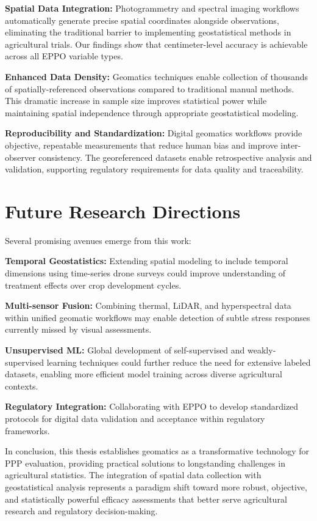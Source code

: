 \documentclass[12pt,a4paper,oneside]{report}
\begin{document}
\textbf{Spatial Data Integration:} Photogrammetry and spectral imaging workflows automatically generate precise spatial coordinates alongside observations, eliminating the traditional barrier to implementing geostatistical methods in agricultural trials. Our findings show that centimeter-level accuracy is achievable across all EPPO variable types.

\textbf{Enhanced Data Density:} Geomatics techniques enable collection of thousands of spatially-referenced observations compared to traditional manual methods. This dramatic increase in sample size improves statistical power while maintaining spatial independence through appropriate geostatistical modeling.

\textbf{Reproducibility and Standardization:} Digital geomatics workflows provide objective, repeatable measurements that reduce human bias and improve inter-observer consistency. The georeferenced datasets enable retrospective analysis and validation, supporting regulatory requirements for data quality and traceability.

\section{Future Research Directions}

Several promising avenues emerge from this work:

\textbf{Temporal Geostatistics:} Extending spatial modeling to include temporal dimensions using time-series drone surveys could improve understanding of treatment effects over crop development cycles.

\textbf{Multi-sensor Fusion:} Combining thermal, LiDAR, and hyperspectral data within unified geomatic workflows may enable detection of subtle stress responses currently missed by visual assessments.

\textbf{Unsupervised ML:} Global development of self-supervised and weakly-supervised learning techniques could further reduce the need for extensive labeled datasets, enabling more efficient model training across diverse agricultural contexts.

\textbf{Regulatory Integration:} Collaborating with EPPO to develop standardized protocols for digital data validation and acceptance within regulatory frameworks.

In conclusion, this thesis establishes geomatics as a transformative technology for PPP evaluation, providing practical solutions to longstanding challenges in agricultural statistics. The integration of spatial data collection with geostatistical analysis represents a paradigm shift toward more robust, objective, and statistically powerful efficacy assessments that better serve agricultural research and regulatory decision-making.


\end{document}
